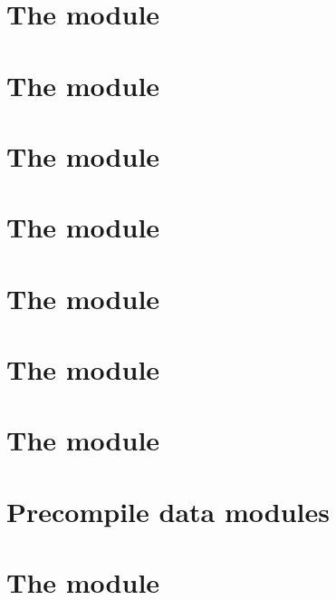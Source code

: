 \documentclass[fleqn]{report}
\begin{document}
\chapter{The \rlpTxnMod{} module}                    \label{chap: txn rlp}         \minitoc    
\chapter{The \userTxnDataMod{} module}               \label{chap: user txn data}   \minitoc    
\chapter{The \systTxnDataMod{} module}               \label{chap: system txn data} \minitoc    
\chapter{The \rlpAddrMod{} module}                   \label{chap: addr rlp}        \minitoc    
\chapter{The \rlpTxnRcptMod{} module}                \label{chap: log rlp}         \minitoc    
\chapter{The \logInfoMod{} module}                   \label{chap: log info}        \minitoc    
\chapter{The \logDataMod{} module}                   \label{chap: log data}        \minitoc    
\chapter{Precompile data modules}                    \label{chap: precompile data} \minitoc    
\chapter{The \rlpUtils{} module}                     \label{chap: rlp utils}       \minitoc    
\end{document}
